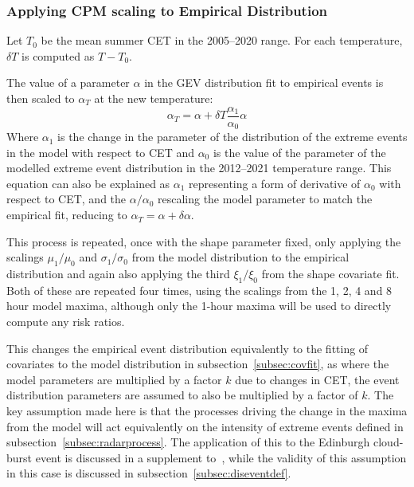 \subsubsection{Applying CPM scaling to Empirical Distribution}

Let $T_0$ be the mean summer CET in the 2005--2020 range.
For each temperature, $\delta T$ is computed as $T - T_0$.

The value of a parameter $\alpha$ in the GEV distribution fit to empirical events is then scaled to $\alpha_T$ at the new temperature:
\begin{equation}\label{eq:newradarparams}
    \alpha_T = \alpha + \delta T \frac{\alpha_1}{\alpha_0} \alpha
\end{equation}
Where $\alpha_1$ is the change in the parameter of the distribution of the extreme events in the model with respect to CET and
    $\alpha_0$ is the value of the parameter of the modelled extreme event distribution in the 2012--2021 temperature range.
This equation can also be explained as $\alpha_1$ representing a form of derivative of $\alpha_0$ with respect to CET,
    and the $\alpha / \alpha_0$ rescaling the model parameter to match the empirical fit, reducing to
    $\alpha_T = \alpha + \delta \alpha$.

This process is repeated, once with the shape parameter fixed, only applying the scalings $\mu_1 / \mu_0$ and $\sigma_1 / \sigma_0$
    from the model distribution to the empirical distribution and again also applying the third $\xi_1 / \xi_0$ from the shape covariate fit.
Both of these are repeated four times, using the scalings from the 1, 2, 4 and 8 hour model maxima,
    although only the 1-hour maxima will be used to directly compute any risk ratios.

This changes the empirical event distribution equivalently to the fitting of covariates to the model distribution in subsection~\ref{subsec:covfit},
    as where the model parameters are multiplied by a factor $k$ due to changes in CET,
    the event distribution parameters are assumed to also be multiplied by a factor of $k$.
The key assumption made here is that the processes driving the change in the maxima from the model will act equivalently
    on the intensity of extreme events defined in subsection~\ref{subsec:radarprocess}.
The application of this to the Edinburgh cloud-burst event is discussed in a supplement to~\cite{Tett_Soon},
    while the validity of this assumption in this case is discussed in subsection~\ref{subsec:diseventdef}.

